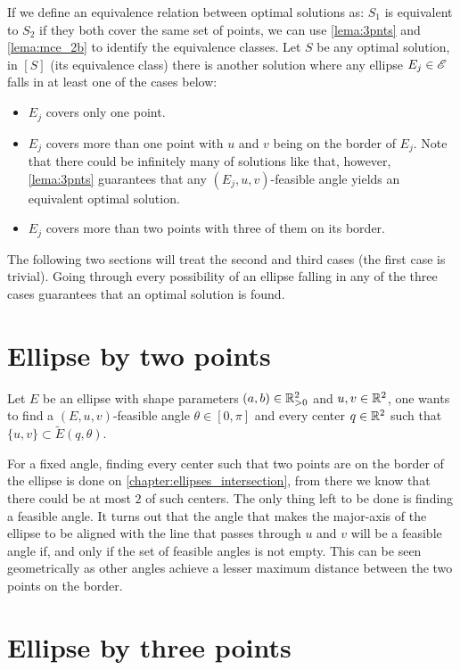 If we define an equivalence relation between optimal solutions as: $S_1$ is equivalent to $S_2$ if they both cover the same set of points, we can use \autoref{lema:3pnts} and \autoref{lema:mce_2b} to identify the equivalence classes. Let $S$ be any optimal solution, in $[S]$ (its equivalence class) there is another solution where any ellipse $E_j \in \mathscr{E}$ falls in at least one of the cases below:
\begin{itemize}
	\item $E_j$ covers only one point.
	\item $E_j$ covers more than one point with $u$ and $v$ being on the border of $E_j$. Note that there could be infinitely many of solutions like that, however, \autoref{lema:3pnts} guarantees that any $(E_j, u, v)$-feasible angle yields an equivalent optimal solution.
	\item $E_j$ covers more than two points with three of them on its border.
\end{itemize}

The following two sections will treat the second and third cases (the first case is trivial). Going through every possibility of an ellipse falling in any of the three cases guarantees that an optimal solution is found.

\section{Ellipse by two points}

Let $E$ be an ellipse with shape parameters $(a, b)\in \mathbb{R}^2_{>0}$ and $u, v\in \mathbb{R}^2$, one wants to find a $(E, u, v)$-feasible angle $\theta\in[0,\pi]$ and every center $q\in\mathbb{R}^2$ such that $\{u, v\} \subset \tilde{E}(q, \theta)$.

For a fixed angle, finding every center such that two points are on the border of the ellipse is done on \autoref{chapter:ellipses_intersection}, from there we know that there could be at most $2$ of such centers. The only thing left to be done is finding a feasible angle. It turns out that the angle that makes the major-axis of the ellipse to be aligned with the line that passes through $u$ and $v$ will be a feasible angle if, and only if the set of feasible angles is not empty. This can be seen geometrically as other angles achieve a lesser maximum distance between the two points on the border.

\section{Ellipse by three points}

